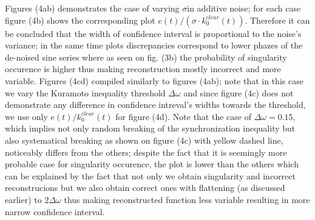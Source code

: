 \documentclass{ws-ijbc}
\begin{document}
Figures (4a\textendash b) demonstrates the case of varying $\sigma$in
additive noise; for each case figure (4b) shows the corresponding
plot $e(t)/\left(\sigma\cdot k_{0}^{clear}(t)\right)$. Therefore
it can be concluded that the width of confidence interval is proportional
to the noise's variance; in the same time plots discrepancies correspond
to lower phazes of the de-noised sine series where as seen on fig.
(3b) the probability of singularity occurence is higher thus making
reconstruction mostly incorrect and more variable. Figures (4c\textendash d)
compiled similarly to figures (4a\textendash b); note that in this
case we vary the Kuramoto inequality threshold $\Delta\omega$ and
since figure (4c) does not demonstrate any difference in confidence
intreval's widths towards the threshold, we use only $e(t)/k_{0}^{clear}(t)$
for figure (4d). Note that the case of $\Delta\omega=0.15$, which
implies not only random breaking of the synchronization inequality
but also systematical breaking as shown on figure (4c) with yellow
dashed line, noticeably differs from the others; despite the fact
that it is seemingly more probable case for singularity occurence,
the plot is lower than the others which can be explained by the fact
that not only we obtain singularity and incorrect reconstrucions but
we also obtain correct ones with flattening (as discussed earlier)
to $2\Delta\omega$ thus making reconstructed function less variable
resulting in more narrow confidence interval.
\end{document}
